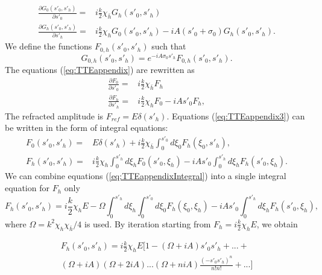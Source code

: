 \documentclass[preprint]{iucr}              %
\begin{document}
\begin{subequations}
\label{eq:TTEappendix}
\begin{align}
    \frac{\partial G_0(s'_0,s'_h)}{\partial s'_0}=&i\frac{k}{2}\chi_{\bar h} G_h(s'_0,s'_h) \\
    \frac{\partial G_h(s'_0,s'_h)}{\partial s'_h}=&i\frac{k}{2}\chi_{h} G_0(s'_0,s'_h) -i A (s'_0+\sigma_0)G_h(s'_0,s'_h).
\end{align}
\end{subequations}
We define the functions $F_{0,h}(s'_0,s'_h)$ such that
\begin{equation}
\label{eq:TTEappendix2}
    G_{0,h}(s'_0,s'_h) = e^{-iA\sigma_0s'_h} F_{0,h}(s'_0,s'_h).
\end{equation}
The equations (\ref{eq:TTEappendix}) are rewritten as
\begin{subequations}
\label{eq:TTEappendix3}
\begin{align}
    \frac{\partial F_0}{\partial s'_0}=&i\frac{k}{2} \chi_{\bar h} F_h \\
    \frac{\partial F_h}{\partial s'_h}=& i\frac{k}{2}\chi_{h}F_0-i A s'_0 F_h,
\end{align}
\end{subequations}
The refracted amplitude is $F_{ref}=E\delta(s'_h)$. 
Equations (\ref{eq:TTEappendix3}) can be written in the form of integral equations:
\begin{subequations}
\label{eq:TTEappendixIntegral}
\begin{align}
    F_0(s'_0,s'_h) =& E \delta(s'_h) +i\frac{k}{2}\chi_{\bar h}\int_0^{s'_0} d\xi_0F_h(\xi_0,s'_h),\\
    F_h(s'_0,s'_h)=& i\frac{k}{2}\chi_{h}\int_0^{s'_h} d\xi_h F_0(s'_0,\xi_h) - i A s'_0 \int_0^{s'_h} d\xi_h F_h(s'_0,\xi_h).
\end{align}
\end{subequations}
We can combine equations (\ref{eq:TTEappendixIntegral}) into a single integral equation for $F_h$ only
\begin{equation}
    \label{eq:TTEappendixSingleIntegral}
    F_h(s'_0,s'_h) = i\frac{k}{2}\chi_h E - \Omega \int_0^{s'_h} d \xi_h \int_0^{s'_0} d\xi_0 F_h(\xi_0,\xi_h) - i A s'_0 \int_0^{s'_h} d\xi_h F_h(s'_0,\xi_h),
\end{equation}
where $\Omega=k^2\chi_h\chi_{\bar h}/4$ is used. By iteration starting from $F_h=i\frac{k}{2}\chi_hE$, we obtain

\begin{align}
    \label{eq:TTEappendixSeries}
    F_h(s'_0,s'_h) = i\frac{k}{2}\chi_h E [ 1 - 
    (\Omega+i A) s'_0s'_h + ...+
    \nonumber \\
    (\Omega+iA)(\Omega+2iA)...(\Omega+niA)
    \frac{(-s'_0 s'_h)^n}{n!n!}
    +...]
\end{align}
\end{document}
